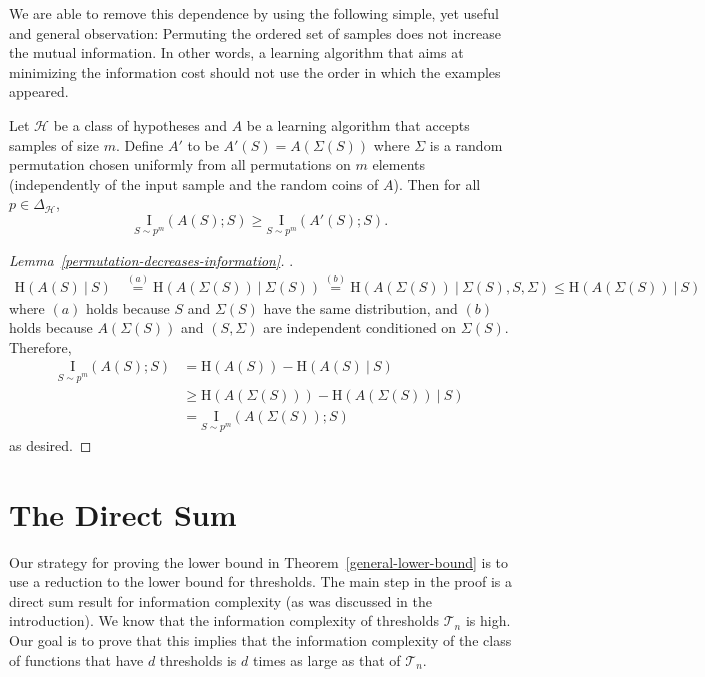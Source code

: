 \documentclass[final,12pt]{colt2018}
\newcommand{\HH}{\mathrm{H}}
\newcommand{\mc}[1]{\mathcal{#1}}
\newcommand{\cH}{\mc{H}}
\newcommand{\cT}{\mc{T}}
\newcommand{\I}[2]{\underset{#1}{\mathrm{I}}\left(#2\right)}
\begin{document}
We are able to remove this dependence by using the following simple, yet useful {and general} observation: Permuting the ordered set of samples does not increase the mutual information.
{In other words, a learning algorithm that aims at minimizing
the information cost should not use the order in which the examples appeared.}

\begin{lemma}\label{permutation-decreases-information}
Let $\cH$ be a class of hypotheses and $A$ be a learning algorithm that accepts samples of size $m$. Define $A'$ to be $A'(S)=A(\Sigma(S))$ where $\Sigma$ is a random permutation chosen uniformly from all permutations on $m$ elements (independently of the input sample and the random coins of $A$). Then	for all $p\in\Delta_\cH$,
	\[
	\I{S \sim p^m}{A(S);S} \geq \I{S \sim p^m}{A'(S);S} .
	\]
\end{lemma}

\begin{proof}[Lemma~\ref{permutation-decreases-information}].
	\begin{align*}
	\HH(A(S) \: | \: S) &\stackrel{(a)}{=} \HH(A(\Sigma(S))\: | \:\Sigma(S)) 
	 \stackrel{(b)}{=} \HH(A(\Sigma(S))\: | \:\Sigma(S), S, \Sigma) 
	 \leq \HH(A(\Sigma(S))\: | \: S)
	\end{align*}
	where $(a)$ holds because $S$ and $\Sigma(S)$ have the same distribution, and $(b)$ holds because $A(\Sigma(S))$ and $(S, \Sigma)$ are independent conditioned on $\Sigma(S)$.
	Therefore,
	\begin{align*}
	\I{S \sim p^m}{A(S);S} & = \HH(A(S))-\HH(A(S) \: | \: S) \\
	 &\geq \HH(A(\Sigma(S))) - \HH(A(\Sigma(S))\: | \: S) \\
	& = \I{S \sim p^m}{A(\Sigma(S));S}
	\end{align*}
	as desired.
\end{proof}




\section{The Direct Sum}\label{direct-sum}

Our strategy for proving the lower bound in Theorem~\ref{general-lower-bound} is to use a reduction to the lower bound for thresholds. 
The main step in the proof is a direct sum result for information complexity
(as was discussed in the introduction).
We know that the information complexity of thresholds $\cT_n$ is high.
Our goal is to prove that this implies that the information complexity
of the class of functions that have $d$ thresholds is $d$ times as large
as that of $\cT_n$.
\end{document}
